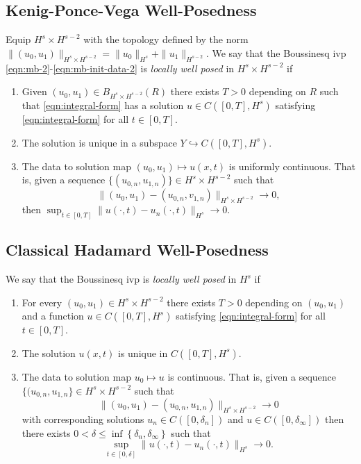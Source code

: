\documentclass[12pt,reqno]{amsart}
\numberwithin{equation}{section}  %
\begin{document}
\subsection{Kenig-Ponce-Vega Well-Posedness} 
        \label{ssec:kpv-wp-bous}
	Equip $H^{s} \times H^{s-2}$ with the 
  topology defined by the norm $\|(u_{0}, u_{1})\|_{H^{s} \times H^{s-2}}
  = \|u_{0}\|_{H^{s}} + \|u_{1}\|_{H^{s-2}}$.
   We say that the Boussinesq ivp
  \eqref{eqn:mb-2}-\eqref{eqn:mb-init-data-2} is
	\emph{locally well posed} in
  $H^s \times H^{s-2}$ if 
	\begin{enumerate}
    \item Given $(u_{0}, u_{1}) \in B_{H^{s} \times H^{s-2}}(R)$
      there exists $T>0$ depending on $R$
      such that \eqref{eqn:integral-form}
      has a solution $u \in C([0, T], H^s)$ satisfying \eqref{eqn:integral-form}
      for all $t \in [0, T]$.
    \item The solution is unique in a subspace $Y \hookrightarrow
      C([0, T], H^{s})$.
    \item
      The data to solution map $(u_0, u_{1}) \mapsto u(x,t)$ is uniformly
      continuous. That
      is, given a sequence $\{(u_{0,n}, u_{1,n} ) \} \in H^{s} \times H^{s-2}$
      such that $$\|(u_{0}, u_{1})
      - (u_{0,n}, v_{1,n}) \|_{H^{s} \times
      H^{s-2}} \to 0,$$ then $\sup_{t \in [0, T]} \| u(\cdot, t) -
      u_{n}(\cdot, t) \|_{H^{s}} \to 0$.
  \end{enumerate}
  \subsection{Classical Hadamard Well-Posedness} 
  \label{ssec:hadamard-wp-bous}
   We say that the Boussinesq ivp
   is
   \emph{locally well posed} in $H^{s}$ if
	\begin{enumerate}
    \item For every $(u_{0}, u_{1}) \in H^{s} \times H^{s-2}$
      there exists $T>0$ depending on $(u_{0}, u_{1})$
      and a function $u \in C([0, T],
  H^{s})$ satisfying \eqref{eqn:integral-form} for all $t \in [0, T]$.
\item The solution $u(x,t)$ is unique in $C([0,T], H^{s})$.  
    \item
      The data to solution map $u_0 \mapsto u$ is continuous. That
      is, given a sequence $\{(u_{0,n}, u_{1,n} \} \in H^{s} \times H^{s-2}$
      such that $$\|(u_{0}, u_{1}) - (u_{0,n}, u_{1,n}) \|_{H^{s} \times
      H^{s-2}} \to 0$$
      with corresponding solutions $u_{n} \in
      C([0,
      \delta_{n}])$ and $u \in C([0, \delta_{\infty}])$
      then there exists $0 < \delta \le \inf\left\{
      \delta_{n}, \delta_{\infty} \right\}$ such that 
      $$\sup_{t \in [0, \delta]} \|u(\cdot, t) - u_{n}(\cdot, t)
      \|_{H^{s}} \to 0 
      .$$
  \end{enumerate}
\end{document}
